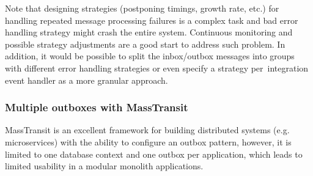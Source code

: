 Note that designing strategies (postponing timings, growth rate, etc.) for handling repeated message processing failures is a complex task and bad error handling strategy might crash the entire system. Continuous monitoring and possible strategy adjustments are a good start to address such problem. In addition, it would be possible to split the inbox/outbox messages into groups with different error handling strategies or even specify a strategy per~integration event handler as a more granular approach.

\newpage
\subsubsection{Multiple outboxes with MassTransit}
\label{problem:multiple}
MassTransit is an excellent framework for building distributed systems (e.g. microservices) with the ability to configure an outbox pattern, however, it is limited to one database context and one outbox per application, which leads to limited usability in a modular monolith applications.

